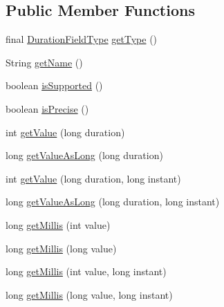 \subsection*{Public Member Functions}
\begin{DoxyCompactItemize}
\item 
final \hyperlink{classorg_1_1joda_1_1time_1_1_duration_field_type}{Duration\-Field\-Type} \hyperlink{classorg_1_1joda_1_1time_1_1field_1_1_unsupported_duration_field_a5a8de05af9b4efe48c8879a94a805882}{get\-Type} ()
\item 
String \hyperlink{classorg_1_1joda_1_1time_1_1field_1_1_unsupported_duration_field_aaa6cc5695ae3762ce9845f3bb9e03621}{get\-Name} ()
\item 
boolean \hyperlink{classorg_1_1joda_1_1time_1_1field_1_1_unsupported_duration_field_a5e67a0b47bbea249cb39cd90e6bdc0fc}{is\-Supported} ()
\item 
boolean \hyperlink{classorg_1_1joda_1_1time_1_1field_1_1_unsupported_duration_field_a0a2a927818c0cc66d18b4cf000e754f0}{is\-Precise} ()
\item 
int \hyperlink{classorg_1_1joda_1_1time_1_1field_1_1_unsupported_duration_field_a26a5a691a1f08f79a4688bdad8ea4d02}{get\-Value} (long duration)
\item 
long \hyperlink{classorg_1_1joda_1_1time_1_1field_1_1_unsupported_duration_field_a46404acba35f819599d158c7cad710b5}{get\-Value\-As\-Long} (long duration)
\item 
int \hyperlink{classorg_1_1joda_1_1time_1_1field_1_1_unsupported_duration_field_af7d8a53fbe6467db031ec50c7bae97e5}{get\-Value} (long duration, long instant)
\item 
long \hyperlink{classorg_1_1joda_1_1time_1_1field_1_1_unsupported_duration_field_aa03b66437d911538c5ff3ad7797787cd}{get\-Value\-As\-Long} (long duration, long instant)
\item 
long \hyperlink{classorg_1_1joda_1_1time_1_1field_1_1_unsupported_duration_field_a8a9747bf89704d8755193dc934fe27ff}{get\-Millis} (int value)
\item 
long \hyperlink{classorg_1_1joda_1_1time_1_1field_1_1_unsupported_duration_field_aee536a4d65542b129fa5837534a32f37}{get\-Millis} (long value)
\item 
long \hyperlink{classorg_1_1joda_1_1time_1_1field_1_1_unsupported_duration_field_a7a9f84c196370bcacd313f15e12167ff}{get\-Millis} (int value, long instant)
\item 
long \hyperlink{classorg_1_1joda_1_1time_1_1field_1_1_unsupported_duration_field_a1169630c439965043669ffdaac8e6bae}{get\-Millis} (long value, long instant)

\end{DoxyCompactItemize}
